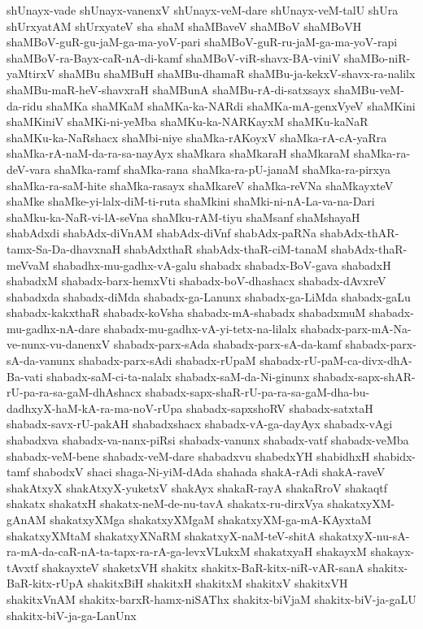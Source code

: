 {shUnayx-vade
shUnayx-vanenxV
shUnayx-veM-dare
shUnayx-veM-talU
shUra
shUrxyatAM
shUrxyateV
sha
shaM
shaMBaveV
shaMBoV
shaMBoVH
shaMBoV-guR-gu-jaM-ga-ma-yoV-pari
shaMBoV-guR-ru-jaM-ga-ma-yoV-rapi
shaMBoV-ra-Bayx-caR-nA-di-kamf
shaMBoV-viR-shavx-BA-viniV
shaMBo-niR-yaMtirxV
shaMBu
shaMBuH
shaMBu-dhamaR
shaMBu-ja-kekxV-shavx-ra-nalilx
shaMBu-maR-heV-shavxraH
shaMBunA
shaMBu-rA-di-satxsayx
shaMBu-veM-da-ridu
shaMKa
shaMKaM
shaMKa-ka-NARdi
shaMKa-mA-genxVyeV
shaMKini
shaMKiniV
shaMKi-ni-yeMba
shaMKu-ka-NARKayxM
shaMKu-kaNaR
shaMKu-ka-NaRshacx
shaMbi-niye
shaMka-rAKoyxV
shaMka-rA-cA-yaRra
shaMka-rA-naM-da-ra-sa-nayAyx
shaMkara
shaMkaraH
shaMkaraM
shaMka-ra-deV-vara
shaMka-ramf
shaMka-rana
shaMka-ra-pU-janaM
shaMka-ra-pirxya
shaMka-ra-saM-hite
shaMka-rasayx
shaMkareV
shaMka-reVNa
shaMkayxteV
shaMke
shaMke-yi-lalx-diM-ti-ruta
shaMkini
shaMki-ni-nA-La-va-na-Dari
shaMku-ka-NaR-vi-lA-seVna
shaMku-rAM-tiyu
shaMsanf
shaMshayaH
shabAdxdi
shabAdx-diVnAM
shabAdx-diVnf
shabAdx-paRNa
shabAdx-thAR-tamx-Sa-Da-dhavxnaH
shabAdxthaR
shabAdx-thaR-ciM-tanaM
shabAdx-thaR-meVvaM
shabadhx-mu-gadhx-vA-galu
shabadx
shabadx-BoV-gava
shabadxH
shabadxM
shabadx-barx-hemxVti
shabadx-boV-dhashacx
shabadx-dAvxreV
shabadxda
shabadx-diMda
shabadx-ga-Lanunx
shabadx-ga-LiMda
shabadx-gaLu
shabadx-kakxthaR
shabadx-koVsha
shabadx-mA-shabadx
shabadxmuM
shabadx-mu-gadhx-nA-dare
shabadx-mu-gadhx-vA-yi-tetx-na-lilalx
shabadx-parx-mA-Na-ve-nunx-vu-danenxV
shabadx-parx-sAda
shabadx-parx-sA-da-kamf
shabadx-parx-sA-da-vanunx
shabadx-parx-sAdi
shabadx-rUpaM
shabadx-rU-paM-ca-divx-dhA-Ba-vati
shabadx-saM-ci-ta-nalalx
shabadx-saM-da-Ni-ginunx
shabadx-sapx-shAR-rU-pa-ra-sa-gaM-dhAshacx
shabadx-sapx-shaR-rU-pa-ra-sa-gaM-dha-bu-dadhxyX-haM-kA-ra-ma-noV-rUpa
shabadx-sapxshoRV
shabadx-satxtaH
shabadx-savx-rU-pakAH
shabadxshacx
shabadx-vA-ga-dayAyx
shabadx-vAgi
shabadxva
shabadx-va-nanx-piRsi
shabadx-vanunx
shabadx-vatf
shabadx-veMba
shabadx-veM-bene
shabadx-veM-dare
shabadxvu
shabedxYH
shabidhxH
shabidx-tamf
shabodxV
shaci
shaga-Ni-yiM-dAda
shahada
shakA-rAdi
shakA-raveV
shakAtxyX
shakAtxyX-yuketxV
shakAyx
shakaR-rayA
shakaRroV
shakaqtf
shakatx
shakatxH
shakatx-neM-de-nu-tavA
shakatx-ru-dirxVya
shakatxyXM-gAnAM
shakatxyXMga
shakatxyXMgaM
shakatxyXM-ga-mA-KAyxtaM
shakatxyXMtaM
shakatxyXNaRM
shakatxyX-naM-teV-shitA
shakatxyX-nu-sA-ra-mA-da-caR-nA-ta-tapx-ra-rA-ga-levxVLukxM
shakatxyaH
shakayxM
shakayx-tAvxtf
shakayxteV
shaketxVH
shakitx
shakitx-BaR-kitx-niR-vAR-sanA
shakitx-BaR-kitx-rUpA
shakitxBiH
shakitxH
shakitxM
shakitxV
shakitxVH
shakitxVnAM
shakitx-barxR-hamx-niSAThx
shakitx-biVjaM
shakitx-biV-ja-gaLU
shakitx-biV-ja-ga-LanUnx
}
